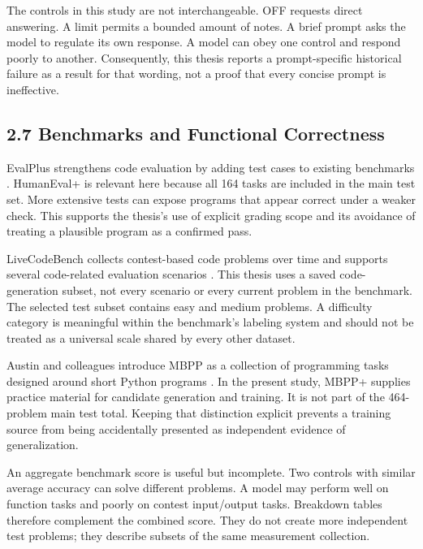 \documentclass[11pt,letterpaper]{article}
\begin{document}
The controls in this study are not interchangeable. OFF requests direct answering. A limit permits a bounded amount of notes. A brief prompt asks the model to regulate its own response. A model can obey one control and respond poorly to another. Consequently, this thesis reports a prompt-specific historical failure as a result for that wording, not a proof that every concise prompt is ineffective.\par

\subsection*{2.7 Benchmarks and Functional Correctness}

EvalPlus strengthens code evaluation by adding test cases to existing benchmarks \cite{evalplus}. HumanEval+ is relevant here because all 164 tasks are included in the main test set. More extensive tests can expose programs that appear correct under a weaker check. This supports the thesis's use of explicit grading scope and its avoidance of treating a plausible program as a confirmed pass.\par

LiveCodeBench collects contest-based code problems over time and supports several code-related evaluation scenarios \cite{lcb}. This thesis uses a saved code-generation subset, not every scenario or every current problem in the benchmark. The selected test subset contains easy and medium problems. A difficulty category is meaningful within the benchmark's labeling system and should not be treated as a universal scale shared by every other dataset.\par

Austin and colleagues introduce MBPP as a collection of programming tasks designed around short Python programs \cite{mbpp}. In the present study, MBPP+ supplies practice material for candidate generation and training. It is not part of the 464-problem main test total. Keeping that distinction explicit prevents a training source from being accidentally presented as independent evidence of generalization.\par

An aggregate benchmark score is useful but incomplete. Two controls with similar average accuracy can solve different problems. A model may perform well on function tasks and poorly on contest input/output tasks. Breakdown tables therefore complement the combined score. They do not create more independent test problems; they describe subsets of the same measurement collection.\par
\end{document}
